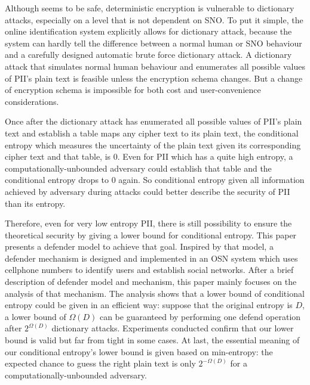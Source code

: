 \documentclass[10pt, conference, compsocconf]{IEEEtran}
\begin{document}
	
	Although seems to be safe, deterministic encryption is 
	vulnerable to dictionary attacks, especially
	on a level that is not dependent on SNO.
	To put it simple, the online identification system explicitly
	allows for dictionary attack, because the system can hardly tell
	the difference between a normal human or SNO behaviour and a carefully 
	designed automatic brute force dictionary attack. A dictionary
	attack that simulates normal human behaviour and enumerates all
	possible values of PII's plain text is feasible unless the encryption
	schema changes. But a change of encryption schema is impossible
	for both cost and user-convenience considerations.	
	
	Once after the dictionary attack has enumerated all possible values
	of PII's plain text and establish a table maps any cipher text
	to its plain text, the conditional entropy \cite{math_book, info_measure}
	which measures the uncertainty of the plain text given
	its corresponding cipher text and that table, is $0$.
	Even for PII which has a quite high entropy, a
	computationally-unbounded adversary could establish that table
	and the conditional entropy drops to $0$ again. 
	So conditional entropy given
	all information achieved by adversary during attacks
	could better describe the security of PII than its entropy.
	
	Therefore, even for very low entropy PII, 
	there is still possibility to ensure the
	theoretical security by giving a lower bound for conditional entropy.
	This paper presents a defender model to achieve that goal.
	Inspired by that model, a defender mechanism is designed and implemented
	in an OSN system which uses cellphone numbers
	to identify users and establish social networks.
	After a brief description of defender model and mechanism,
	this paper mainly focuses on the analysis of that mechanism.
	The analysis shows that a lower bound 
	of conditional entropy could be given in an efficient way: suppose that the original entropy
	is $D$, a lower bound of $\Omega(D)$ can be guaranteed
	by performing one defend operation after $2^{\Omega(D)}$ 
	dictionary attacks.
	Experiments conducted confirm that
	our lower bound is valid but far from tight in some cases. At last, the essential
	meaning of our conditional entropy's lower bound is given based on min-entropy: 
	the expected chance to guess the right plain text is only $2^{-\Omega(D)}$ for
	a computationally-unbounded adversary.
	
\end{document}
